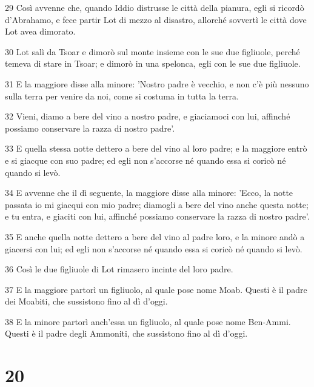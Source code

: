 \par 29 Così avvenne che, quando Iddio distrusse le città della pianura, egli si ricordò d'Abrahamo, e fece partir Lot di mezzo al disastro, allorché sovvertì le città dove Lot avea dimorato.
\par 30 Lot salì da Tsoar e dimorò sul monte insieme con le sue due figliuole, perché temeva di stare in Tsoar; e dimorò in una spelonca, egli con le sue due figliuole.
\par 31 E la maggiore disse alla minore: 'Nostro padre è vecchio, e non c'è più nessuno sulla terra per venire da noi, come si costuma in tutta la terra.
\par 32 Vieni, diamo a bere del vino a nostro padre, e giaciamoci con lui, affinché possiamo conservare la razza di nostro padre'.
\par 33 E quella stessa notte dettero a bere del vino al loro padre; e la maggiore entrò e si giacque con suo padre; ed egli non s'accorse né quando essa si coricò né quando si levò.
\par 34 E avvenne che il dì seguente, la maggiore disse alla minore: 'Ecco, la notte passata io mi giacqui con mio padre; diamogli a bere del vino anche questa notte; e tu entra, e giaciti con lui, affinché possiamo conservare la razza di nostro padre'.
\par 35 E anche quella notte dettero a bere del vino al padre loro, e la minore andò a giacersi con lui; ed egli non s'accorse né quando essa si coricò né quando si levò.
\par 36 Così le due figliuole di Lot rimasero incinte del loro padre.
\par 37 E la maggiore partorì un figliuolo, al quale pose nome Moab. Questi è il padre dei Moabiti, che sussistono fino al dì d'oggi.
\par 38 E la minore partorì anch'essa un figliuolo, al quale pose nome Ben-Ammi. Questi è il padre degli Ammoniti, che sussistono fino al dì d'oggi.

\chapter{20}

